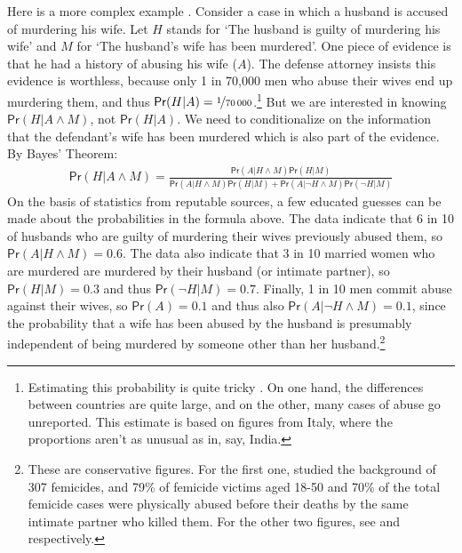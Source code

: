 \documentclass{article}
\newcommand{\pr}{\mathsf{Pr}}
\begin{document}
%

Here is a more complex  example \citep[an elaboration of][p.\ 66]{blitzstein2014introduction}.   
 Consider a case in which a husband is accused of murdering his wife. Let $H$ stands for `The husband is guilty of murdering his wife' and $M$ for `The husband's wife has been murdered'. One piece of evidence is that he had a history of abusing his wife ($A$). The defense attorney insists this evidence is worthless, because only 1 in 70,000 men who abuse their wives end up murdering them, and thus $\pr(H\vert A)=\nicefrac{1}{70\,000}$.\footnote{Estimating this probability is quite tricky \citep{United-Nations-Office-on-Drugs-and-Crime2018Global-Study-on}. On one hand, the differences between countries are quite large, and on the other, many cases of abuse go unreported. This estimate is based on figures from Italy, where the proportions aren't as unusual as in, say, India.} 
%
%
But we are interested in knowing  $\pr(H\vert A\wedge M)$, not  
$\pr(H\vert A)$. We need to conditionalize  on the information that the defendant's wife has been murdered which is also part of the evidence.
By Bayes' Theorem:
%
\begin{align*}
\pr(H\vert A \wedge M)  =  \frac{\pr(A\vert H\wedge M)\pr(H\vert M)}
{\pr(A\vert H\wedge M)\pr(H\vert M) +
\pr(A\vert \neg H \wedge M)\pr(\neg H\vert M) }
\end{align*}
%
On the basis of statistics from reputable sources, a few educated guesses can be made about the probabilities in the  formula above. The data indicate that 6 in 10 of husbands who are guilty of murdering their wives previously abused them, so $\pr(A\vert H\wedge M)=0.6$. The data also indicate that 3 in 10 married women who are murdered are murdered by their husband (or intimate partner), so $\pr(H\vert M)= 0.3$ and thus $\pr(\neg H\vert M)=0.7$. Finally, 1 in 10 men commit abuse against their wives, so $\pr(A)=0.1$ and thus also $\pr(A\vert \neg H\wedge M)=0.1$, since the probability that a wife has been abused by the husband is presumably independent of being murdered by someone other than her husband.\footnote{These are conservative figures. For the first one, \citet{campbell2003RiskFactorsFemicide} studied the background of 307 femicides, and 79\% of femicide victims aged 18-50 and 70\% of the total femicide cases  were physically abused before their deaths by the same intimate partner who killed them. For the other two figures, see \citep{Fundamental-Rights2015Violence-agains} and \citep{United-Nations-Office-on-Drugs-and-Crime2018Global-Study-on} respectively.}  
\end{document}
